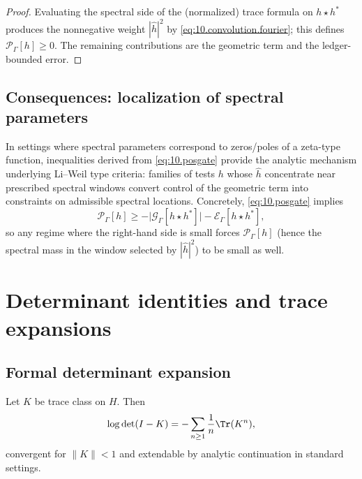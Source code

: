 \begin{proof}
Evaluating the spectral side of the (normalized) trace formula on $h\star h^\ast$ produces the nonnegative weight
$|\widehat h|^2$ by \eqref{eq:10.convolution.fourier}; this defines $\mathcal P_\Gamma[h]\ge0$. The remaining contributions are the
geometric term and the ledger-bounded error.
\end{proof}

\subsection{Consequences: localization of spectral parameters}
\label{subsec:10.pos.localization}

In settings where spectral parameters correspond to zeros/poles of a zeta-type function, inequalities derived from
\eqref{eq:10.posgate} provide the analytic mechanism underlying Li--Weil type criteria: families of tests $h$ whose
$\widehat h$ concentrate near prescribed spectral windows convert control of the geometric term into constraints on admissible
spectral locations. Concretely, \eqref{eq:10.posgate} implies
\begin{equation}\label{eq:10.pos.localization.ineq}
\mathcal P_\Gamma[h]
\ge
-\big|\mathcal G_\Gamma[h\star h^\ast]\big|
-\mathcal E_\Gamma[h\star h^\ast],
\end{equation}
so any regime where the right-hand side is small forces $\mathcal P_\Gamma[h]$ (hence the spectral mass in the window selected by
$|\widehat h|^2$) to be small as well.

\section{Determinant identities and trace expansions}
\label{sec:10.det-trace}

\subsection{Formal determinant expansion}
\label{subsec:10.det.formal}

Let $K$ be trace class on $H$. Then
\begin{equation}\label{eq:10.det.id}
\log\det(I-K)=-\sum_{n\ge1}\frac{1}{n}\Tr(K^n),
\end{equation}
convergent for $\|K\|<1$ and extendable by analytic continuation in standard settings.

